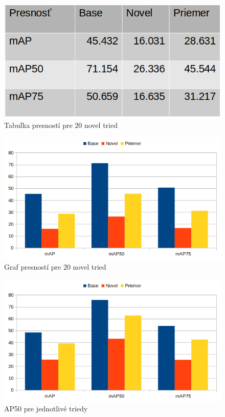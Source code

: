 \begin{figure}[H]
\centering
\includegraphics[width=\textwidth]{images/20novel_table.png}
\caption{Tabuľka presností pre 20 novel tried}
\label{fig:image64}
\end{figure}

\begin{figure}[H]
\centering
\includegraphics[width=\textwidth]{images/20novel_chart.png}
\caption{Graf presností pre 20 novel tried}
\label{fig:image65}
\end{figure}

\begin{figure}[H]
\centering
\includegraphics[width=\textwidth]{images/10novel_chart.png}
\caption{AP50 pre jednotlivé triedy}
\label{fig:image613}
\end{figure}

